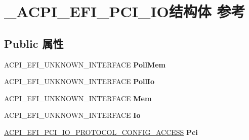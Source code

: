 \hypertarget{struct___a_c_p_i___e_f_i___p_c_i___i_o}{}\section{\+\_\+\+A\+C\+P\+I\+\_\+\+E\+F\+I\+\_\+\+P\+C\+I\+\_\+\+I\+O结构体 参考}
\label{struct___a_c_p_i___e_f_i___p_c_i___i_o}
\subsection*{Public 属性}
\begin{DoxyCompactItemize}
\item 
\mbox{\label{struct___a_c_p_i___e_f_i___p_c_i___i_o_a1a2e0dfccb8af713c9ce7d839a4ed3e3}} 
A\+C\+P\+I\+\_\+\+E\+F\+I\+\_\+\+U\+N\+K\+N\+O\+W\+N\+\_\+\+I\+N\+T\+E\+R\+F\+A\+CE {\bfseries Poll\+Mem}
\item 
\mbox{\label{struct___a_c_p_i___e_f_i___p_c_i___i_o_acd416b3253486e8f72e5e7cd15460be4}} 
A\+C\+P\+I\+\_\+\+E\+F\+I\+\_\+\+U\+N\+K\+N\+O\+W\+N\+\_\+\+I\+N\+T\+E\+R\+F\+A\+CE {\bfseries Poll\+Io}
\item 
\mbox{\label{struct___a_c_p_i___e_f_i___p_c_i___i_o_a5c995cb112a7758e7c109e41bf80e8c0}} 
A\+C\+P\+I\+\_\+\+E\+F\+I\+\_\+\+U\+N\+K\+N\+O\+W\+N\+\_\+\+I\+N\+T\+E\+R\+F\+A\+CE {\bfseries Mem}
\item 
\mbox{\label{struct___a_c_p_i___e_f_i___p_c_i___i_o_aac8a7d668cb920f7746dcbdb76a3c7eb}} 
A\+C\+P\+I\+\_\+\+E\+F\+I\+\_\+\+U\+N\+K\+N\+O\+W\+N\+\_\+\+I\+N\+T\+E\+R\+F\+A\+CE {\bfseries Io}
\item 
\mbox{\label{struct___a_c_p_i___e_f_i___p_c_i___i_o_a4dda2d6e72523d08a7098b47af094e3d}} 
\hyperlink{struct_a_c_p_i___e_f_i___p_c_i___i_o___p_r_o_t_o_c_o_l___c_o_n_f_i_g___a_c_c_e_s_s}{A\+C\+P\+I\+\_\+\+E\+F\+I\+\_\+\+P\+C\+I\+\_\+\+I\+O\+\_\+\+P\+R\+O\+T\+O\+C\+O\+L\+\_\+\+C\+O\+N\+F\+I\+G\+\_\+\+A\+C\+C\+E\+SS} {\bfseries Pci}
\item 
\mbox{\label{struct___a_c_p_i___e_f_i___p_c_i___i_o_a96d8cd4a116571a06c98c16c2439e760}} 

\end{DoxyCompactItemize}
